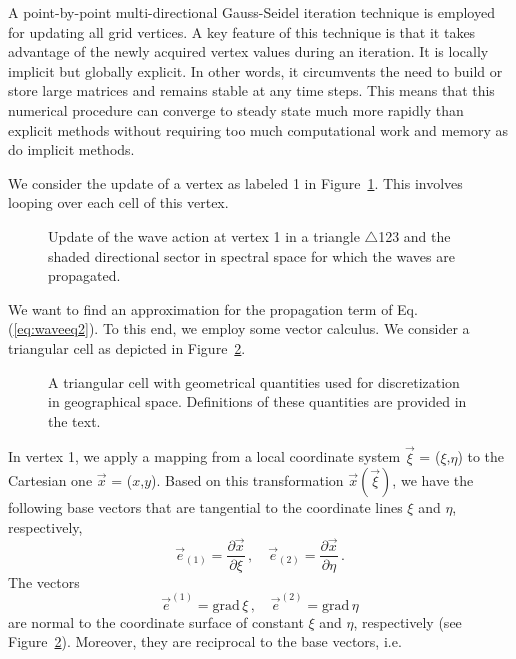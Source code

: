 \documentclass[12pt]{book}
\begin{document}
A point-by-point multi-directional Gauss-Seidel iteration technique is employed for updating all grid vertices.
A key feature of this technique is that it takes advantage of the newly acquired vertex values during an iteration.
It is locally implicit but globally explicit. In other words, it circumvents the need to build or store large matrices and remains stable at any time steps.
This means that this numerical procedure can converge to steady state much more rapidly than
explicit methods without requiring too much computational work and memory as do implicit methods.

We consider the update of a vertex as labeled 1 in Figure~\ref{fig:gsunstruc}. This involves looping over each cell of this vertex.
\begin{figure}[htb]
   \centerline{
              }
      \caption{Update of the wave action at vertex 1 in a triangle $\triangle$123 and the shaded directional sector
               in spectral space for which the waves are propagated.}
      \label{fig:gsunstruc}
\end{figure}
We want to find an approximation for the propagation term of Eq. (\ref{eq:waveeq2}). To this end, we employ some vector calculus.
We consider a triangular cell as depicted in Figure~\ref{fig:celldisc}.
\begin{figure}[htb]
   \centerline{
              }
      \caption{A triangular cell with geometrical quantities used for discretization in geographical space. Definitions of these quantities are provided in the text.}
      \label{fig:celldisc}
\end{figure}
In vertex 1, we apply a mapping from a local coordinate system $\vec{\xi}$ = ($\xi$,$\eta$) to the
Cartesian one $\vec{x}$ = ($x$,$y$).
Based on this transformation $\vec{x}(\vec{\xi})$, we have the following base vectors that are tangential to the coordinate lines $\xi$ and $\eta$, respectively,
\begin{equation}
  {\vec{e}}_{(1)}  = \frac{\partial \vec{x}}{\partial \xi} \, , \quad {\vec{e}}_{(2)}  = \frac{\partial \vec{x}}{\partial \eta} \, .
\end{equation}
The vectors
\begin{equation}
  {\vec{e}}^{(1)}  = \mbox{grad} \, \xi \, , \quad {\vec{e}}^{(2)}  = \mbox{grad} \, \eta
\end{equation}
are normal to the coordinate surface of constant $\xi$ and $\eta$, respectively (see Figure~\ref{fig:celldisc}). Moreover, they are reciprocal to the base vectors, i.e.
\end{document}
